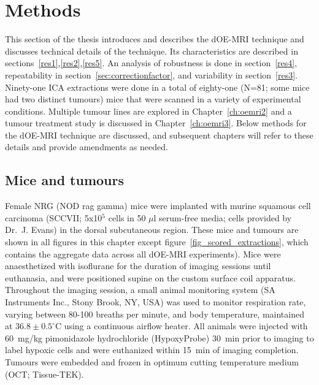 \section{Methods}

This section of the thesis introduces and describes the \acs{dOE-MRI} technique and discusses technical details of the technique. 
Its characteristics are described in sections~\ref{res1},\ref{res2},\ref{res5}.
An analysis of robustness is done in section~\ref{res4}, repeatability in section~\ref{sec:correctionfactor}, and variability in section~\ref{res3}.
Ninety-one ICA extractions were done in a total of eighty-one (N=81; some mice had two distinct tumours) mice that were scanned in a variety of experimental conditions.
Multiple tumour lines are explored in Chapter~\ref{ch:oemri2} and a tumour treatment study is discussed in Chapter~\ref{ch:oemri3}.
Below methods for the \acs{dOE-MRI} technique are discussed, and subsequent chapters will refer to these details and provide amendments as needed. 

\subsection{Mice and tumours}

Female NRG (NOD rag gamma) mice were implanted with murine squamous cell carcinoma (SCCVII; 5x10$^5$ cells in 50 $\mu$l serum-free media; cells provided by Dr.\ J. Evans) in the dorsal subcutaneous region.
These mice and tumours are shown in all figures in this chapter except figure~\ref{fig_scored_extractions}, which contains the aggregate data across all \acs{dOE-MRI} experiments).
Mice were anaesthetized with isoflurane for the duration of imaging sessions until euthanasia, and were positioned supine on the custom surface coil apparatus.
Throughout the imaging session, a small animal monitoring system (SA Instruments Inc., Stony Brook, NY, USA) was used to monitor respiration rate, varying between 80-100 breaths per minute, and body temperature, maintained at $36.8 \pm 0.5^\circ$C using a continuous airflow heater.
All animals were injected with 60~mg/kg pimonidazole hydrochloride (HypoxyProbe) 30~min prior to imaging to label hypoxic cells and were euthanized within 15~min of imaging completion.
Tumours were embedded and frozen in optimum cutting temperature medium (OCT; Tissue-TEK).


